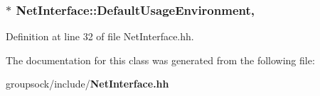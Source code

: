 \subsubsection[{Default\+Usage\+Environment}]{$\ast$ Net\+Interface\+::\+Default\+Usage\+Environment\hspace{0.3cm}{\ttfamily [static]}, {\ttfamily [inherited]}}\label{classNetInterface_a570b15d8141a04f1d2691af1783dc30d}


Definition at line 32 of file Net\+Interface.\+hh.



The documentation for this class was generated from the following file\+:\begin{DoxyCompactItemize}
\item 
groupsock/include/{\bf Net\+Interface.\+hh}\end{DoxyCompactItemize}

